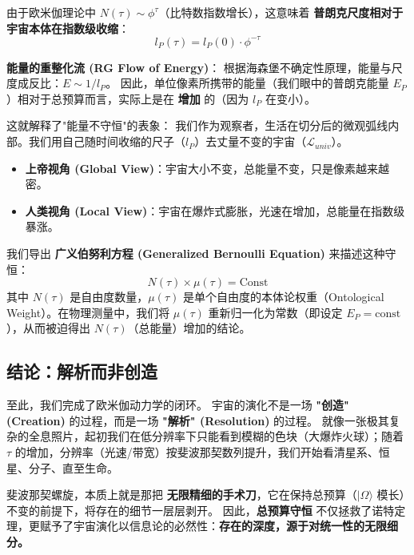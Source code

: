 由于欧米伽理论中 $N(\tau) \sim \phi^{\tau}$（比特数指数增长），这意味着 \textbf{普朗克尺度相对于宇宙本体在指数级收缩}：
\[l_P(\tau) = l_P(0) \cdot \phi^{-\tau}\]

\textbf{能量的重整化流 (RG Flow of Energy)}：
根据海森堡不确定性原理，能量与尺度成反比：$E \sim 1/l_P$。
因此，单位像素所携带的能量（我们眼中的普朗克能量 $E_P$）相对于总预算而言，实际上是在 \textbf{增加} 的（因为 $l_P$ 在变小）。

这就解释了"能量不守恒"的表象：
我们作为观察者，生活在切分后的微观弧线内部。我们用自己随时间收缩的尺子（$l_P$）去丈量不变的宇宙（$\mathcal{L}_{univ}$）。

\begin{itemize}
\item \textbf{上帝视角 (Global View)}：宇宙大小不变，总能量不变，只是像素越来越密。
\item \textbf{人类视角 (Local View)}：宇宙在爆炸式膨胀，光速在增加，总能量在指数级暴涨。
\end{itemize}

我们导出 \textbf{广义伯努利方程 (Generalized Bernoulli Equation)} 来描述这种守恒：
\[N(\tau) \times \mu(\tau) = \text{Const}\]
其中 $N(\tau)$ 是自由度数量，$\mu(\tau)$ 是单个自由度的本体论权重（Ontological Weight）。在物理测量中，我们将 $\mu(\tau)$ 重新归一化为常数（即设定 $E_P = \text{const}$），从而被迫得出 $N(\tau)$（总能量）增加的结论。

\subsection{结论：解析而非创造}

至此，我们完成了欧米伽动力学的闭环。
宇宙的演化不是一场 \textbf{"创造" (Creation)} 的过程，而是一场 \textbf{"解析" (Resolution)} 的过程。
就像一张极其复杂的全息照片，起初我们在低分辨率下只能看到模糊的色块（大爆炸火球）；随着 $\tau$ 的增加，分辨率（光速/带宽）按斐波那契数列提升，我们开始看清星系、恒星、分子、直至生命。

斐波那契螺旋，本质上就是那把 \textbf{无限精细的手术刀}，它在保持总预算（$|\Omega\rangle$ 模长）不变的前提下，将存在的细节一层层剥开。
因此，\textbf{总预算守恒} 不仅拯救了诺特定理，更赋予了宇宙演化以信息论的必然性：\textbf{存在的深度，源于对统一性的无限细分。}

